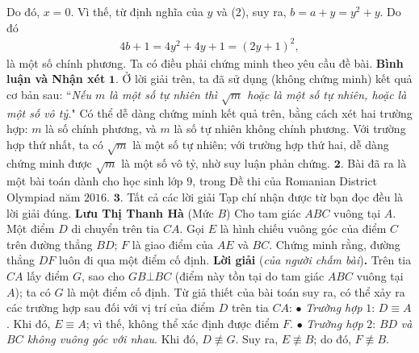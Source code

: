 \begin{multicols}{2}
	\vskip 0.05cm 
	Do đó, $x = 0$. Vì thế, từ định nghĩa của $y$ và ($2$), suy ra, $b = a + y = {y^2} + y$.
	\vskip 0.05cm
	Do đó
	\begin{align*}
		4b + 1 = 4{y^2} + 4y + 1 = {\left( {2y + 1} \right)^2},
	\end{align*}
	là một số chính phương.
	\vskip 0.05cm
	Ta có điều phải chứng minh theo yêu cầu đề bài.
	\vskip 0.05cm
	\textbf{\color{thachthuctoanhoc}Bình luận và Nhận xét}
	\vskip 0.05cm
	$\pmb{1.}$ Ở lời giải trên, ta đã sử dụng (không chứng minh) kết quả cơ bản sau:
	\vskip 0.05cm
	``\textit{Nếu $m$ là một số tự nhiên thì  $\sqrt{m}$ hoặc là một số tự nhiên, hoặc là một số vô tỷ.}"
	\vskip 0.05cm
	Có thể dễ dàng chứng minh kết quả trên, bằng cách xét hai trường hợp: $m$ là số chính phương, và $m$ là số tự nhiên không chính phương. Với trường hợp thứ nhất, ta có $\sqrt{m}$ là một số tự nhiên; với trường hợp thứ hai, dễ dàng chứng minh được  $\sqrt{m}$ là một số vô tỷ, nhờ suy luận phản chứng.
	\vskip 0.05cm
	$\pmb{2.}$ Bài đã ra là một bài toán dành cho học sinh lớp $9$, trong Đề thi của Romanian District Olympiad năm $2016$.
	\vskip 0.05cm
	$\pmb{3.}$ Tất cả các lời giải Tạp chí nhận được từ bạn đọc đều là lời giải đúng.
	\vskip 0.05cm
	\hfill	\textbf{\color{thachthuctoanhoc}Lưu Thị Thanh Hà}
	\vskip 0.05cm
	{}
	(Mức $B$) Cho tam giác $ABC$ vuông tại $A$. Một điểm $D$ di chuyển trên tia $CA$. Gọi $E$ là hình chiếu vuông góc của điểm $C$ trên đường thẳng $BD$; $F$ là giao điểm của $AE$ và $BC$. Chứng minh rằng, đường thẳng $DF$ luôn đi qua một điểm cố định.
	\vskip 0.05cm
	\textbf{\color{thachthuctoanhoc}Lời giải} (\textit{của người chấm bài})\textbf{\color{thachthuctoanhoc}.}
	\vskip 0.05cm
	Trên tia $CA$ lấy điểm $G$, sao cho $GB \bot BC$ (điểm này tồn tại do tam giác $ABC$ vuông tại $A$); ta có $G$ là một điểm cố định.
	\vskip 0.05cm
	Từ giả thiết của bài toán suy ra, có thể xảy ra các trường hợp sau đối với vị trí của điểm $D$ trên tia $CA$:
	\vskip 0.05cm
	$\bullet$ \textit{Trường hợp} $1$: $D \equiv A$.
	\vskip 0.05cm
	Khi đó, $E \equiv A$; vì thế, không thể xác định được điểm $F$.
	\vskip 0.05cm
	$\bullet$ \textit{Trường hợp} $2$: $BD$ \textit{và $BC$ không vuông góc với nhau}.
	\vskip 0.05cm
	Khi đó, $D \not\equiv G$.  Suy ra, $E \not\equiv B$; do đó, $F \not\equiv B$.  
	\begin{figure}[H]
		\centering
		\vspace*{-5pt}
		\captionsetup{labelformat= empty, justification=centering}

\end{figure}
\end{multicols}
